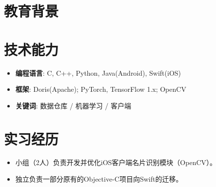\documentclass{resume}
\begin{document}


 

\section{教育背景}
\section{技术能力}
\begin{itemize}
  \item \textbf{编程语言}: C, C++, Python, Java(Android), Swift(iOS)
  \item \textbf{框架}: Doris(Apache); PyTorch, TensorFlow 1.x; OpenCV
  \item \textbf{关键词}: 数据仓库 / 机器学习 / 客户端
\end{itemize}


\section{实习经历}
\begin{itemize}
  \item 小组（2人）负责开发并优化iOS客户端名片识别模块（OpenCV）。
  \item 独立负责一部分原有的Objective-C项目向Swift的迁移。
\end{itemize}
\end{document}
